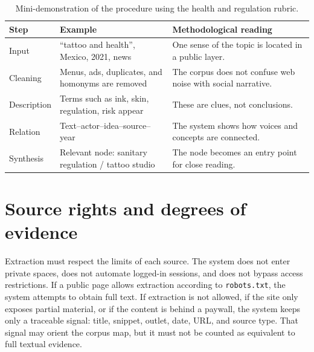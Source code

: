 \documentclass[11pt]{article}
\begin{document}
\begin{table}[H]
\centering
\small
\begin{tabular}{L{0.18\textwidth}L{0.25\textwidth}L{0.42\textwidth}}
\toprule
\textbf{Step} & \textbf{Example} & \textbf{Methodological reading} \\
\midrule
Input & ``tattoo and health'', Mexico, 2021, news & One sense of the topic is located in a public layer. \\
Cleaning & Menus, ads, duplicates, and homonyms are removed & The corpus does not confuse web noise with social narrative. \\
Description & Terms such as ink, skin, regulation, risk appear & These are clues, not conclusions. \\
Relation & Text--actor--idea--source--year & The system shows how voices and concepts are connected. \\
Synthesis & Relevant node: sanitary regulation / tattoo studio & The node becomes an entry point for close reading. \\
\bottomrule
\end{tabular}
\caption{Mini-demonstration of the procedure using the health and regulation rubric.}
\label{tab:mini-demo-en}
\end{table}

\section{Source rights and degrees of evidence}

Extraction must respect the limits of each source. The system does not enter
private spaces, does not automate logged-in sessions, and does not bypass access
restrictions. If a public page allows extraction according to \texttt{robots.txt},
the system attempts to obtain full text. If extraction is not allowed, if the
site only exposes partial material, or if the content is behind a paywall, the
system keeps only a traceable signal: title, snippet, outlet, date, URL, and
source type. That signal may orient the corpus map, but it must not be counted
as equivalent to full textual evidence.
\end{document}
